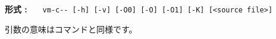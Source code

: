 \begin{flushleft}
{\bf 形式 : }~~~\verb/vm-c-- [-h] [-v] [-O0] [-O] [-O1] [-K] [<source file>]/
\end{flushleft}

引数の意味は{\cmmc}コマンドと同様です。
%

